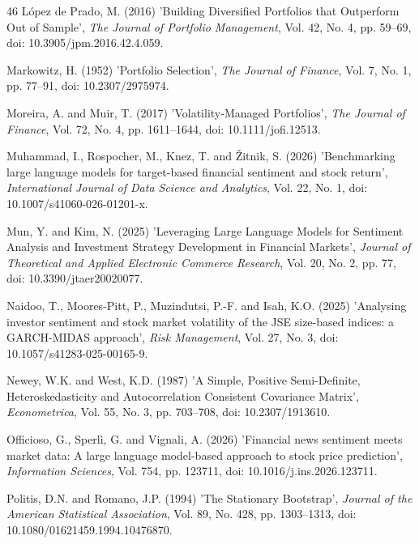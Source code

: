 \documentclass{singlecol-new}
\theoremstyle{TH}{
\newtheorem{lemma}{Lemma}
\newtheorem{theorem}[lemma]{Theorem}
\newtheorem{corrolary}[lemma]{Corrolary}
\newtheorem{conjecture}[lemma]{Conjecture}
\newtheorem{proposition}[lemma]{Proposition}
\newtheorem{claim}[lemma]{Claim}
\newtheorem{stheorem}[lemma]{Wrong Theorem}
\newtheorem{algorithm}{Algorithm}
}
\theoremstyle{THrm}{
\newtheorem{definition}{Definition}[section]
\newtheorem{question}{Question}[section]
\newtheorem{remark}{Remark}
\newtheorem{scheme}{Scheme}
}
\theoremstyle{THhit}{
\newtheorem{case}{Case}[section]
}
\begin{document}
\begin{thebibliography}{46}
López de Prado, M. (2016) 'Building Diversified Portfolios that Outperform Out of Sample', {\it The Journal of Portfolio Management}, Vol. 42, No. 4, pp. 59--69, doi: 10.3905/jpm.2016.42.4.059.

Markowitz, H. (1952) 'Portfolio Selection', {\it The Journal of Finance}, Vol. 7, No. 1, pp. 77--91, doi: 10.2307/2975974.

Moreira, A. and Muir, T. (2017) 'Volatility‐Managed Portfolios', {\it The Journal of Finance}, Vol. 72, No. 4, pp. 1611--1644, doi: 10.1111/jofi.12513.

Muhammad, I., Rospocher, M., Knez, T. and Žitnik, S. (2026) 'Benchmarking large language models for target-based financial sentiment and stock return', {\it International Journal of Data Science and Analytics}, Vol. 22, No. 1, doi: 10.1007/s41060-026-01201-x.

Mun, Y. and Kim, N. (2025) 'Leveraging Large Language Models for Sentiment Analysis and Investment Strategy Development in Financial Markets', {\it Journal of Theoretical and Applied Electronic Commerce Research}, Vol. 20, No. 2, pp. 77, doi: 10.3390/jtaer20020077.

Naidoo, T., Moores-Pitt, P., Muzindutsi, P.-F. and Isah, K.O. (2025) 'Analysing investor sentiment and stock market volatility of the JSE size-based indices: a GARCH-MIDAS approach', {\it Risk Management}, Vol. 27, No. 3, doi: 10.1057/s41283-025-00165-9.

Newey, W.K. and West, K.D. (1987) 'A Simple, Positive Semi-Definite, Heteroskedasticity and Autocorrelation Consistent Covariance Matrix', {\it Econometrica}, Vol. 55, No. 3, pp. 703--708, doi: 10.2307/1913610.

Officioso, G., Sperlì, G. and Vignali, A. (2026) 'Financial news sentiment meets market data: A large language model-based approach to stock price prediction', {\it Information Sciences}, Vol. 754, pp. 123711, doi: 10.1016/j.ins.2026.123711.

Politis, D.N. and Romano, J.P. (1994) 'The Stationary Bootstrap', {\it Journal of the American Statistical Association}, Vol. 89, No. 428, pp. 1303--1313, doi: 10.1080/01621459.1994.10476870.


\end{thebibliography}
\end{document}
